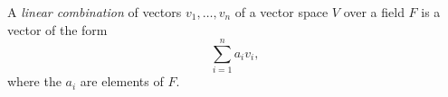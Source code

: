 \documentclass{article}
\renewcommand{\vec}[1]{#1}
\begin{document}
A \emph{linear combination} of vectors $\vec{v}_1,\dots,\vec{v}_n$ 
of a vector space $V$ over a field $F$ is a vector of the form
$$\sum_{i=1}^n a_i\vec{v}_i,$$
where the $a_i$ are elements of $F$.
\end{document}
